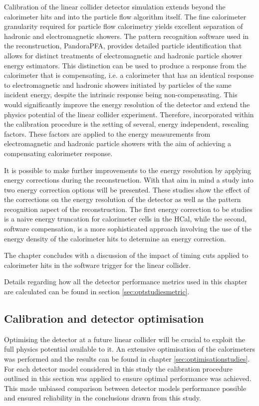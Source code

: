 Calibration of the linear collider detector simulation extends beyond the calorimeter hits and into the particle flow algorithm itself.  The fine calorimeter granularity required for particle flow calorimetry yields excellent separation of hadronic and electromagnetic showers.  The pattern recognition software used in the reconstruction, PandoraPFA, provides detailed particle identification that allows for distinct treatments of electromagnetic and hadronic particle shower energy estimators.  This distinction can be used to produce a response from the calorimeter that is compensating, i.e. a calorimeter that has an identical response to electromagnetic and hadronic showers initiated by particles of the same incident energy, despite the intrinsic response being non-compensating.  This would significantly improve the energy resolution of the detector and extend the physics potential of the linear collider experiment.  Therefore, incorporated within the calibration procedure is the setting of several, energy independent, rescaling factors.  These factors are applied to the energy measurements from electromagnetic and hadronic particle showers with the aim of achieving a compensating calorimeter response.  

It is possible to make further improvements to the energy resolution by applying energy corrections during the reconstruction.  With that aim in mind a study into two energy correction options will be presented.  These studies show the effect of the corrections on the energy resolution of the detector as well as the pattern recognition aspect of the reconstruction.  The first energy correction to be studies is a naive energy truncation for calorimeter cells in the HCal, while the second, software compensation, is a more sophisticated approach involving the use of the energy density of the calorimeter hits to determine an energy correction.  

The chapter concludes with a discussion of the impact of timing cuts applied to calorimeter hits in the software trigger for the linear collider.   

Details regarding how all the detector performance metrics used in this chapter are calculated can be found in section \ref{sec:optstudiesmetric}.


\subsection{Calibration and detector optimisation}
Optimising the detector at a future linear collider will be crucial to exploit the full physics potential available to it.  An extensive optimisation of the calorimeters was performed and the results can be found in chapter \ref{sec:optimisationstudies}.  For each detector model considered in this study the calibration procedure outlined in this section was applied to ensure optimal performance was achieved.  This made unbiased comparison between detector models performance possible and ensured reliability in the conclusions drawn from this study.

